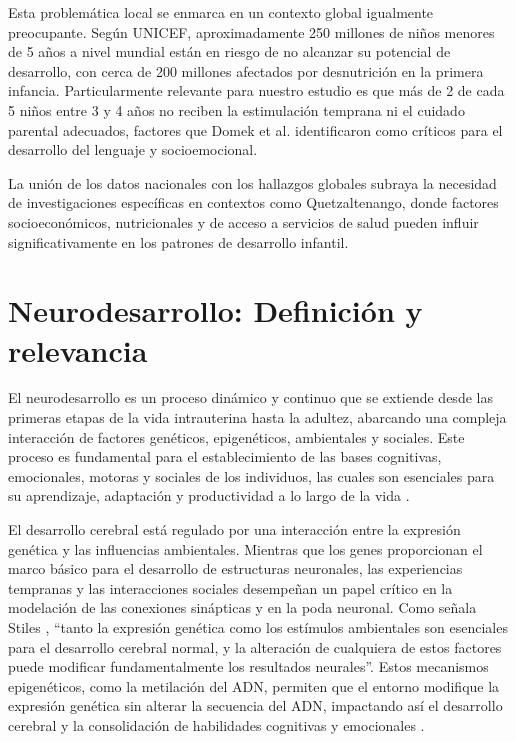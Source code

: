\documentclass[11pt,letterpaper]{report}
\begin{document}
Esta problemática local se enmarca en un contexto global igualmente 
preocupante. Según UNICEF\cite{UNICEF2023}, aproximadamente 250 millones de 
niños menores de 5 años a nivel mundial están en riesgo de no alcanzar su 
potencial de desarrollo, con cerca de 200 millones afectados por desnutrición 
en la primera infancia. Particularmente relevante para nuestro estudio es que 
más de 2 de cada 5 niños entre 3 y 4 años no reciben la estimulación temprana 
ni el cuidado parental adecuados, factores que Domek et al.\cite{Domek2023} 
identificaron como críticos para el desarrollo del lenguaje y socioemocional. 

La unión de los datos nacionales con los hallazgos globales subraya la 
necesidad de investigaciones específicas en contextos como Quetzaltenango, 
donde factores socioeconómicos, nutricionales y de acceso a servicios de salud 
pueden influir significativamente en los patrones de desarrollo infantil.

\section{Neurodesarrollo: Definición y relevancia}
El neurodesarrollo es un proceso dinámico y continuo que se extiende desde 
las primeras etapas de la vida intrauterina hasta la adultez, abarcando una 
compleja interacción de factores genéticos, epigenéticos, ambientales y 
sociales. Este proceso es fundamental para el establecimiento de las bases 
cognitivas, emocionales, motoras y sociales de los individuos, las cuales 
son esenciales para su aprendizaje, adaptación y productividad a lo largo 
de la vida \cite{Stiles2010, Nelson49}.

El desarrollo cerebral está regulado por una interacción entre la expresión 
genética y las influencias ambientales. Mientras que los genes proporcionan 
el marco básico para el desarrollo de estructuras neuronales, las 
experiencias tempranas y las interacciones sociales desempeñan un papel 
crítico en la modelación de las conexiones sinápticas y en la poda neuronal. 
Como señala Stiles \cite{Stiles2010}, ``tanto la expresión genética como los
estímulos ambientales son esenciales para el desarrollo cerebral normal, y la
alteración de cualquiera de estos factores puede modificar fundamentalmente los
resultados neurales''. Estos mecanismos epigenéticos, como la metilación del
ADN, permiten que el entorno modifique la expresión genética sin alterar la
secuencia del ADN,  impactando así el desarrollo cerebral y la consolidación de
habilidades cognitivas y emocionales \cite{Roth2011, Feldman2}.
\end{document}
